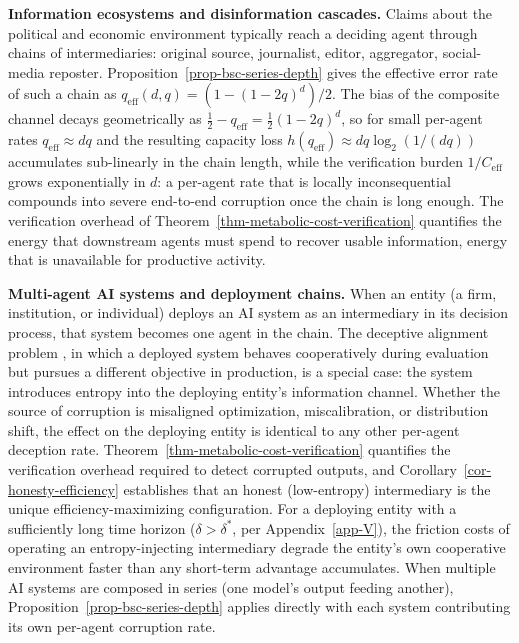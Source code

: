 \documentclass[11pt]{article}
\theoremstyle{plain}
\theoremstyle{definition}
\theoremstyle{remark}
\begin{document}
\textbf{Information ecosystems and disinformation cascades.} Claims
about the political and economic environment typically reach a deciding
agent through chains of intermediaries: original source, journalist,
editor, aggregator, social-media reposter.
Proposition~\ref{prop-bsc-series-depth} gives the effective error rate
of such a chain as \(q_{\text{eff}}(d, q) = (1 - (1 - 2q)^d)/2\). The
bias of the composite channel decays geometrically as
\(\tfrac{1}{2} - q_{\text{eff}} = \tfrac{1}{2}(1 - 2q)^d\), so for small
per-agent rates \(q_{\text{eff}} \approx d q\) and the resulting
capacity loss \(h(q_{\text{eff}}) \approx d q \log_2(1/(d q))\)
accumulates sub-linearly in the chain length, while the verification
burden \(1/C_{\text{eff}}\) grows exponentially in \(d\): a per-agent
rate that is locally inconsequential compounds into severe end-to-end
corruption once the chain is long enough. The verification overhead of
Theorem~\ref{thm-metabolic-cost-verification} quantifies the energy that
downstream agents must spend to recover usable information, energy that
is unavailable for productive activity.

\textbf{Multi-agent AI systems and deployment chains.} When an entity (a
firm, institution, or individual) deploys an AI system as an
intermediary in its decision process, that system becomes one agent in
the chain. The deceptive alignment problem \citep{Hubinger2019}, in
which a deployed system behaves cooperatively during evaluation but
pursues a different objective in production, is a special case: the
system introduces entropy into the deploying entity's information
channel. Whether the source of corruption is misaligned optimization,
miscalibration, or distribution shift, the effect on the deploying
entity is identical to any other per-agent deception rate.
Theorem~\ref{thm-metabolic-cost-verification} quantifies the
verification overhead required to detect corrupted outputs, and
Corollary~\ref{cor-honesty-efficiency} establishes that an honest
(low-entropy) intermediary is the unique efficiency-maximizing
configuration. For a deploying entity with a sufficiently long time
horizon (\(\delta > \delta^*\), per Appendix~\ref{app-V}), the friction
costs of operating an entropy-injecting intermediary degrade the
entity's own cooperative environment faster than any short-term
advantage accumulates. When multiple AI systems are composed in series
(one model's output feeding another),
Proposition~\ref{prop-bsc-series-depth} applies directly with each
system contributing its own per-agent corruption rate.
\end{document}
